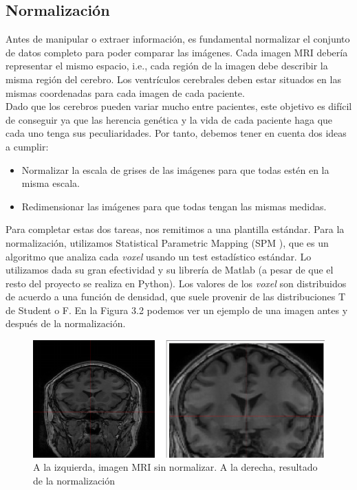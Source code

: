 \subsection{Normalización}

Antes de manipular o extraer información, es fundamental normalizar el conjunto de datos completo para poder comparar las imágenes. Cada imagen MRI debería representar el mismo espacio, i.e., cada región de la imagen debe describir la misma región del cerebro. Los ventrículos cerebrales deben estar situados en las mismas coordenadas para cada imagen de cada paciente. \\

Dado que los cerebros pueden variar mucho entre pacientes, este objetivo es difícil de conseguir ya que las herencia genética y la vida de cada paciente haga que cada uno tenga sus peculiaridades. Por tanto, debemos tener en cuenta dos ideas a cumplir:

\begin{itemize}
	\item Normalizar la escala de grises de las imágenes para que todas estén en la misma escala.
	\item Redimensionar las imágenes para que todas tengan las mismas medidas.
\end{itemize}

Para completar estas dos tareas, nos remitimos a una plantilla estándar. Para la normalización, utilizamos Statistical Parametric Mapping (SPM \cite{spm}), que es un algoritmo que analiza cada \textit{voxel} usando un test estadístico estándar. Lo utilizamos dada su gran efectividad y su librería de Matlab (a pesar de que el resto del proyecto se realiza en Python). Los valores de los \textit{voxel} son distribuidos de acuerdo a una función de densidad, que suele provenir de las distribuciones T de Student o F. En la Figura 3.2 podemos ver un ejemplo de una imagen antes y después de la normalización.

 \begin{figure}[H] %
	\centering
	\includegraphics[scale=0.6]{norm.png}  %
	\caption{A la izquierda, imagen MRI sin normalizar. A la derecha, resultado de la normalización} 
	\label{fig:norm}
\end{figure}

